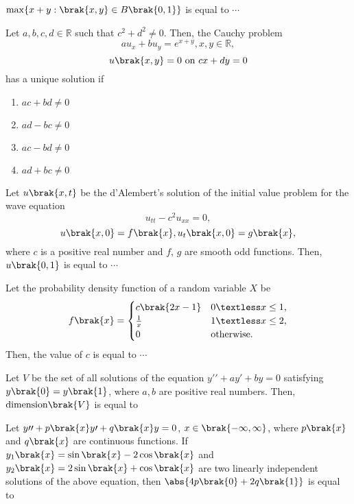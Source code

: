     \item $\max \{x+y : \brak{x, y} \in B\brak{0,1}\}$ is equal to $\cdots$



    \item Let $a, b, c, d \in \mathbb{R}$ such that $c^2 + d^2 \neq 0$. Then, the Cauchy problem
    $$a u_x + b u_y = e^{x+y},  x, y \in \mathbb{R},$$
    $$u\brak{x,y} = 0 \text{ on } cx + dy = 0$$
    has a unique solution if
    \begin{enumerate}
        \item $a c + b d \neq 0$
        \item $a d - b c \neq 0$
        \item $a c - b d \neq 0$
        \item $a d + b c \neq 0$
    \end{enumerate}


    \item Let $u\brak{x, t}$ be the d'Alembert's solution of the initial value problem for the wave equation
    $$u_{tt} - c^2 u_{xx} = 0,$$
    $$u\brak{x, 0} = f\brak{x}, u_t\brak{x, 0} = g\brak{x},$$
    where $c$ is a positive real number and $f$, $g$ are smooth odd functions. Then, $u\brak{0,1}$ is equal to $\cdots$

    \item Let the probability density function of a random variable $X$ be
    $$f\brak{x} = \begin{cases} 
      c\brak{2x - 1} & 0 \textless x \leq 1, \\
      \frac{1}{x} & 1 \textless x \leq 2, \\
      0 & \text{otherwise}.
   \end{cases}$$
    Then, the value of $c$ is equal to $\cdots$

    \item Let $V$ be the set of all solutions of the equation $y{\prime}{\prime} + a y{\prime} + b y = 0$ satisfying $y\brak{0} = y\brak{1}$, where $a, b$ are positive real numbers. Then, $\text{dimension}\brak{V}$ is equal to

    \item Let $y{\prime}{\prime} + p\brak{x} y{\prime} + q\brak{x}y = 0$, $x \in \brak{-\infty, \infty}$, where $p\brak{x}$ and $q\brak{x}$ are continuous functions. If $y_1\brak{x} = \sin\brak{x} - 2 \cos\brak{x}$ and $y_2\brak{x} = 2 \sin\brak{x} + \cos\brak{x}$ are two linearly independent solutions of the above equation, then $\abs{ 4p\brak{0} + 2 q\brak{1} }$ is equal to

